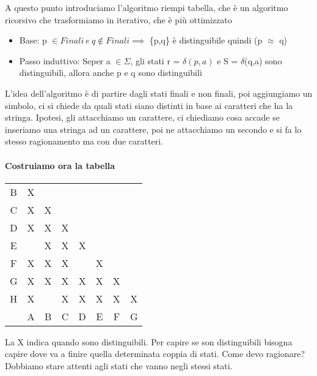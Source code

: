 \documentclass[12pt, a4paper, openany, oneside]{book}
\begin{document}
\begin{center}
\end{center}
A questo punto introduciamo l'algoritmo riempi tabella, che è un algoritmo 
ricorsivo che trasformiamo in iterativo, che è più ottimizzato
\begin{itemize}
	\item Base: p $\in Finali ~ e ~ q \notin Finali \implies$ \{p,q\} è distinguibile
	quindi (p $\approx$ q)
	\item Passo induttivo: Seper a $\in \Sigma$, gli stati r = $\delta(p, a)$ e
	S = $\delta$(q,a) sono distinguibili, allora anche p e q sono distinguibili
\end{itemize}
L'idea dell'algoritmo è di partire dagli stati finali e non finali, poi aggiungiamo
un simbolo, ci si chiede da quali stati siano distinti in base ai caratteri che
ha la stringa. Ipotesi, gli attacchiamo un carattere, ci chiediamo cosa accade 
se inseriamo una stringa ad un carattere, poi ne attacchiamo un secondo e si 
fa lo stesso ragionamento ma con due caratteri. 
\paragraph{Costruiamo ora la tabella}
\begin{center}
\begin{tabular}{ c|c|c|c|c|c|c|c| } 
\hline
B & X &  &  &  &  &  & \\ 
C & X & X &  &  &  &  & \\ 
D & X & X & X &  &  &  & \\
E &  & X & X & X &  &  & \\ 
F & X & X & X &  & X &  &  \\ 
G & X & X & X & X & X & X & \\
H & X &  & X & X & X & X & X\\ 
\hline
& A & B & C & D & E & F & G \\ 
\hline
\end{tabular}
\end{center}
La X indica quando sono distinguibili. Per capire se son distinguibili bisogna
capire dove va a finire quella determinata coppia di stati. Come devo ragionare?
Dobbiamo stare attenti agli stati che vanno negli stessi stati.
\end{document}
